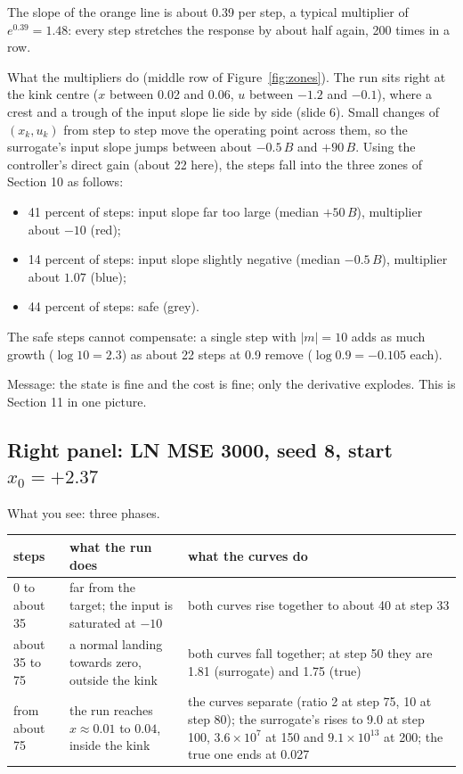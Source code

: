 \documentclass[11pt]{article}
\begin{document}
The slope of the orange line is about 0.39 per step, a typical multiplier of $e^{0.39}=1.48$: every step stretches the response by about half again, 200 times in a row.

What the multipliers do (middle row of Figure~\ref{fig:zones}). The run sits right at the kink centre ($x$ between 0.02 and 0.06, $u$ between $-1.2$ and $-0.1$), where a crest and a trough of the input slope lie side by side (slide 6). Small changes of $(x_k,u_k)$ from step to step move the operating point across them, so the surrogate's input slope jumps between about $-0.5\,B$ and $+90\,B$. Using the controller's direct gain (about 22 here), the steps fall into the three zones of Section 10 as follows:
\begin{itemize}
\item 41 percent of steps: input slope far too large (median $+50\,B$), multiplier about $-10$ (red);
\item 14 percent of steps: input slope slightly negative (median $-0.5\,B$), multiplier about $1.07$ (blue);
\item 44 percent of steps: safe (grey).
\end{itemize}
The safe steps cannot compensate: a single step with $|m|=10$ adds as much growth ($\log10=2.3$) as about 22 steps at 0.9 remove ($\log0.9=-0.105$ each).

Message: the state is fine and the cost is fine; only the derivative explodes. This is Section 11 in one picture.

\subsection{Right panel: LN MSE 3000, seed 8, start $x_0=+2.37$}

What you see: three phases.

\begin{center}
\small
\begin{tabular}{p{2.2cm}p{5.2cm}p{6.6cm}}
\toprule
steps & what the run does & what the curves do \\
\midrule
0 to about 35 & far from the target; the input is saturated at $-10$ & both curves rise together to about 40 at step 33 \\
about 35 to 75 & a normal landing towards zero, outside the kink & both curves fall together; at step 50 they are 1.81 (surrogate) and 1.75 (true) \\
from about 75 & the run reaches $x\approx0.01$ to $0.04$, inside the kink & the curves separate (ratio 2 at step 75, 10 at step 80); the surrogate's rises to 9.0 at step 100, $3.6\times10^7$ at 150 and $9.1\times10^{13}$ at 200; the true one ends at 0.027 \\
\bottomrule
\end{tabular}
\end{center}
\end{document}
